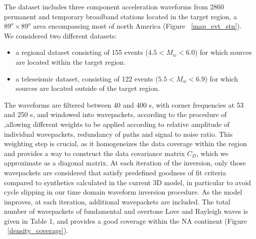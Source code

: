 \documentclass[12pt]{article}
\begin{document}
The dataset includes three component acceleration waveforms from 2860 permanent and temporary broadband stations located in the target region, a $89^o \times 89^o $ area encompassing most of north America (Figure ~\ref{map_evt_stn}). We considered two different datasets:
\begin{itemize}
	\item a regional dataset consisting of 155 events ($4.5 < M_w < 6.0$) for which sources are located within the target region.
	\item a teleseismic dataset, consisting of 122 events ($5.5 <M_w <6.9$) for which sources are located outside of the target region.
\end{itemize}

The waveforms are filtered between 40 and 400 s, with corner frequencies at 53 and 250 s, and windowed into wavepackets, according to the procedure of \cite{li1996global} ,allowing different weights to be applied according to relative amplitude of individual wavepackets, redundancy of paths and signal to noise ratio. 
This weighting step is crucial, as it homogeneizes the data coverage within the region and provides a way to construct the data covariance matrix $C_D$, which we approximate as a diagonal matrix. 
At each iteration of the inversion, only those wavepackets are considered that satisfy predefined goodness of fit criteria compared to synthetics calculated in the current 3D model, in particular to avoid cycle slipping in our time domain waveform inversion procedure. 
As the model improves, at each iteration, additional wavepackets are included. 
The total number of wavepackets of fundamental and overtone Love and Rayleigh waves is given in Table 1, and provides a good coverage within the NA continent (Figure ~\ref{density_coverage}).
\end{document}

